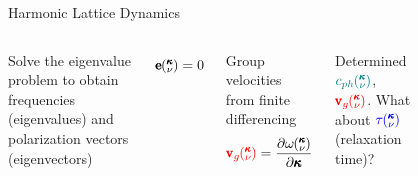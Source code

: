 \documentclass{beamer}
\newcommand{\kv}{\mspace{-4.0mu}\left(\mspace{-8.0mu}
\begin{smallmatrix}&\pmb{\kappa} \\&\nu\end{smallmatrix}
\mspace{-3.0mu}\right)}
\begin{document}
\begin{frame}{Harmonic Lattice Dynamics}
\begin{columns}

Solve the eigenvalue problem to obtain frequencies (eigenvalues) and polarization vectors (eigenvectors)

\begin{equation}
[D(\pmb{\kappa})-I\omega^2\kv]\pmb{\mathrm{e}}\kv = 0
\end{equation}

Group velocities from finite differencing
\begin{equation}\label{EQ:NMD:vg}
\begin{split}
\textcolor{red}{\pmb{\mathrm{v}}_{g}\kv}=\frac{\partial \omega \kv}{\partial \pmb{\kappa}}
\end{split}
\end{equation}

Determined $\textcolor{teal}{c_{ph}\kv}$, $\textcolor{red}{\pmb{\mathrm{v}}_{g}\kv}$. What about $\textcolor{blue}{\tau\kv}$ (relaxation time)?
\begin{figure}[t]
\begin{center}
\vspace*{-0.8cm}
\renewcommand{\figure}{Fig.}
\label{fig:bulk_dis_dos}
\end{center}
\end{figure}
\end{columns}

\end{frame}
\end{document}
